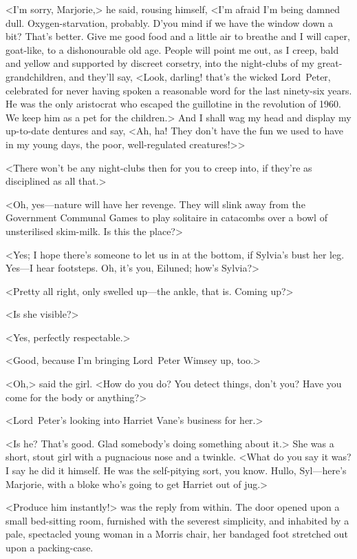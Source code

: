 <I'm sorry, Marjorie,> he said, rousing himself, <I'm afraid I'm being damned dull. Oxygen-starvation, probably. D'you mind if we have the window down a bit? That's better. Give me good food and a little air to breathe and I will caper, goat-like, to a dishonourable old age. People will point me out, as I creep, bald and yellow and supported by discreet corsetry, into the night-clubs of my great-grandchildren, and they'll say, <Look, darling! that's the wicked Lord~Peter, celebrated for never having spoken a reasonable word for the last ninety-six years. He was the only aristocrat who escaped the guillotine in the revolution of 1960. We keep him as a pet for the children.> And I shall wag my head and display my up-to-date dentures and say, <Ah, ha! They don't have the fun we used to have in my young days, the poor, well-regulated creatures!>>

<There won't be any night-clubs then for you to creep into, if they're as disciplined as all that.>

<Oh, yes—nature will have her revenge. They will slink away from the Government Communal Games to play solitaire in catacombs over a bowl of unsterilised skim-milk. Is this the place?>

<Yes; I hope there's someone to let us in at the bottom, if Sylvia's bust her leg. Yes—I hear footsteps. Oh, it's you, Eiluned; how's Sylvia?>

<Pretty all right, only swelled up—the ankle, that is. Coming up?>

<Is she visible?>

<Yes, perfectly respectable.>

<Good, because I'm bringing Lord~Peter Wimsey up, too.>

<Oh,> said the girl. <How do you do? You detect things, don't you? Have you come for the body or anything?>

<Lord~Peter's looking into Harriet Vane's business for her.>

<Is he? That's good. Glad somebody's doing something about it.> She was a short, stout girl with a pugnacious nose and a twinkle. <What do you say it was? I say he did it himself. He was the self-pitying sort, you know. Hullo, Syl—here's Marjorie, with a bloke who's going to get Harriet out of jug.>

<Produce him instantly!> was the reply from within. The door opened upon a small bed-sitting room, furnished with the severest simplicity, and inhabited by a pale, spectacled young woman in a Morris chair, her bandaged foot stretched out upon a packing-case.

